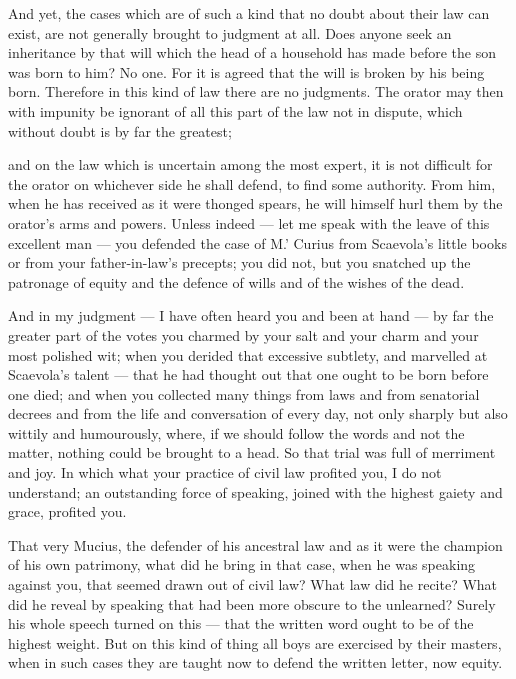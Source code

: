  And yet, the cases which are of such a kind that no doubt about their law can exist, are not generally brought to judgment at all. Does anyone seek an inheritance by that will which the head of a household has made before the son was born to him? No one. For it is agreed that the will is broken by his being born. Therefore in this kind of law there are no judgments. The orator may then with impunity be ignorant of all this part of the law not in dispute, which without doubt is by far the greatest;

 and on the law which is uncertain among the most expert, it is not difficult for the orator on whichever side he shall defend, to find some authority. From him, when he has received as it were thonged spears, he will himself hurl them by the orator's arms and powers. Unless indeed — let me speak with the leave of this excellent man — you defended the case of M.' Curius from Scaevola's little books or from your father-in-law's precepts; you did not, but you snatched up the patronage of equity and the defence of wills and of the wishes of the dead.

 And in my judgment — I have often heard you and been at hand — by far the greater part of the votes you charmed by your salt and your charm and your most polished wit; when you derided that excessive subtlety, and marvelled at Scaevola's talent — that he had thought out that one ought to be born before one died; and when you collected many things from laws and from senatorial decrees and from the life and conversation of every day, not only sharply but also wittily and humourously, where, if we should follow the words and not the matter, nothing could be brought to a head. So that trial was full of merriment and joy. In which what your practice of civil law profited you, I do not understand; an outstanding force of speaking, joined with the highest gaiety and grace, profited you.

 That very Mucius, the defender of his ancestral law and as it were the champion of his own patrimony, what did he bring in that case, when he was speaking against you, that seemed drawn out of civil law? What law did he recite? What did he reveal by speaking that had been more obscure to the unlearned? Surely his whole speech turned on this — that the written word ought to be of the highest weight. But on this kind of thing all boys are exercised by their masters, when in such cases they are taught now to defend the written letter, now equity.

